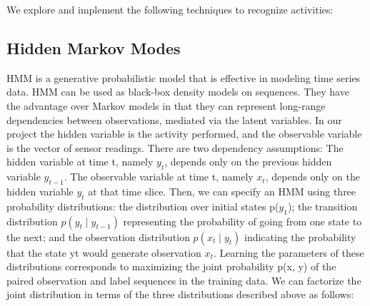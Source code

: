 \documentclass[11pt, oneside]{article}   	%
\begin{document}
We explore and implement the following techniques to recognize activities:
%
%
%
%
%
%


\subsection{Hidden Markov Modes}
HMM is a generative probabilistic model that is effective in modeling time series data. 
HMM can be used as black-box density models on sequences. They have the advantage over Markov models in that they can represent long-range dependencies between observations, mediated via the latent variables. 
In our project the hidden variable is the activity performed, and the observable variable is the vector of sensor readings. There are two dependency assumptions: The hidden variable at time t, namely $y_{t}$, depends only on the previous hidden variable $y_{t-1}$. The observable variable at time t, namely $x_{t}$, depends only on the hidden variable $y_{t}$ at that time slice. Then, we can specify an HMM using three probability distributions: the distribution over initial states p($y_{1}$); the transition distribution $p(y_{t}\mid y_{t-1})$ representing the probability of going from one state to the next; and the observation distribution $p(x_{t}\mid y_{t})$ indicating the probability that the state yt would generate observation $x_{t}$.
Learning the parameters of these distributions corresponds to maximizing the joint probability p(x, y) of the paired observation and label sequences in the training data. We can factorize the joint distribution in terms of the three distributions described above as follows:
\end{document}
